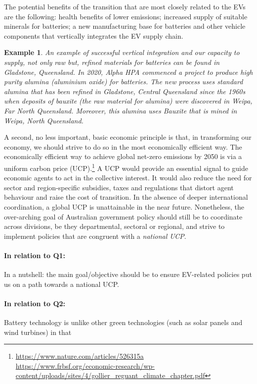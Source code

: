 \documentclass[12pt, draft]{article} \usepackage[shortlabels]{enumitem}
\newtheorem*{example*}{Example}
\begin{document}
The potential benefits of the transition that are most closely related to the
EVs are the following: health benefits of lower emissions; increased supply of
suitable minerals for batteries; a new manufacturing base for batteries and
other vehicle components that vertically integrates the EV supply chain.
\begin{example*}
 
  An example of successful vertical integration and our capacity to supply, not
  only raw but, \emph{refined materials} for batteries can be found in
  Gladstone, Queensland. In 2020, Alpha HPA commenced a project to produce high
  purity alumina (aluminium oxide) for batteries. The new process uses standard
  alumina that has been refined in Gladstone, Central Queensland since the
  1960s when deposits of bauxite (the raw material for alumina) were discovered
  in Weipa, Far North Queensland.  Moreover, this alumina uses Bauxite that is
  mined in Weipa, North Queensland.

\end{example*} 

A second, no less important, basic economic principle is that, in transforming
our economy, we should strive to do so in the most economically efficient way.
The economically efficient way to achieve global net-zero emissions by 2050 is
via a uniform carbon price
(UCP).\footnote{\url{https://www.nature.com/articles/526315a}\\
\url{https://www.frbsf.org/economic-research/wp-content/uploads/sites/4/gollier_reguant_climate_chapter.pdf}}
A UCP would provide an essential signal to guide economic agents to act in the
collective interest. It would also reduce the need for sector and
region-specific subsidies, taxes and regulations that distort agent behaviour
and raise the cost of transition. In the absence of deeper international
coordination, a global UCP is unattainable in the near future. Nonetheless, the
over-arching goal of Australian government policy should still be to coordinate
across divisions, be they departmental, sectoral or regional, and strive to
implement policies that are congruent with a \emph{national UCP}.

\paragraph{In relation to Q1:} In a nutshell: the main goal/objective should be
to ensure EV-related policies put us on a path towards a national UCP.

\paragraph{In relation to Q2:} Battery technology is unlike other green
technologies (such as solar panels and wind turbines) in that
\end{document}
